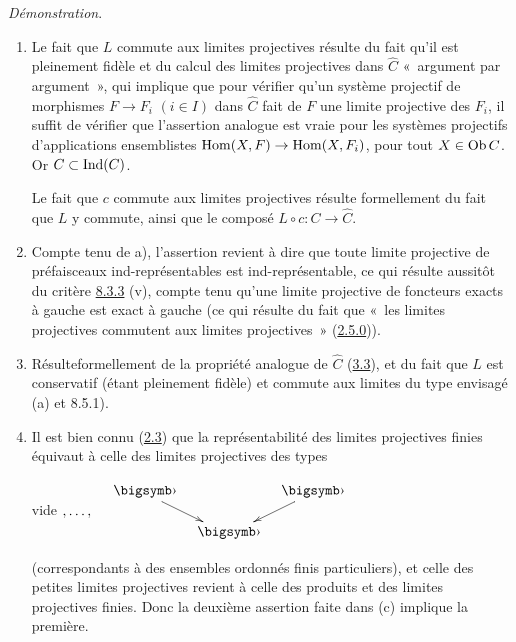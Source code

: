 \documentclass[10pt]{../fichiers-configuration-latex/smfart}
\def\labelenumi{(\theenumi)}
\begin{document}
\noindent \emph{Démonstration}.
\begin{enumerate}
\renewcommand{\theenumi}{\alph{enumi}}
\renewcommand{\labelenumi}{\theenumi)}
\item Le fait que $L$ commute aux limites projectives résulte du
fait qu'il est pleinement fidèle et du calcul des limites
projectives dans $\widehat{C}$ « argument par argument », qui
implique que pour vérifier qu'un système projectif de morphismes
$F\rightarrow F_i$ $(i\in I)$ dans $\widehat{C}$ fait de $F$ une
limite projective des $F_i$, il suffit de vérifier que l'assertion
analogue est vraie pour les %
systèmes projectifs d'applications ensemblistes
$\operatorname{Hom}(X,F)\rightarrow \operatorname{Hom}(X,F_i)$, pour tout $X\in \operatorname{Ob} C$. Or
$C\subset \operatorname{Ind}(C)$.

Le fait que $c$ commute aux limites projectives résulte formellement
du fait que $L$ y commute, ainsi que le composé $L\circ
c:C\rightarrow \widehat{C}$.

\item Compte tenu de a), l'assertion revient à dire que toute
limite projective de préfaisceaux ind-représentables est
ind-représentable, ce qui résulte aussitôt du critère
\hyperref[I.them8.3.3]{8.3.3} (v),
compte tenu qu'une limite projective de foncteurs exacts à gauche
est exact à gauche (ce qui résulte du fait que « les limites
projectives commutent aux limites projectives » (\hyperref[I.sec2.5.0]{2.5.0})).

\item Résulte\pageoriginale formellement de la propriété
  analogue de
$\widehat{C}$ (\hyperref[I.cor3.3]{3.3}), et du fait que $L$ est conservatif (étant
pleinement fidèle) et commute aux limites du type envisagé (a) et
8.5.1).

\item Il est bien connu (\cf \hyperref[I.prop2.3]{2.3}) que la
  représentabilité des
limites projectives finies équivaut à celle des limites projectives
des types

\begin{center}
vide $, \ldots ,\quad \vcenter{ \xymatrix@C=.25cm@R=.5cm{
                     \bigdot \ar[rd]&       &\bigdot\ar[ld]\\
                             &\bigdot&
}}$
\end{center}

\noindent (correspondants à des ensembles ordonnés finis
particuliers), et celle des petites limites projectives revient à
celle des produits et des limites projectives finies. Donc la
deuxième assertion faite dans (c) implique la première.
\end{enumerate}
\end{document}
